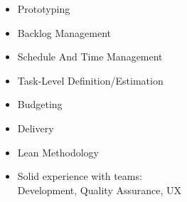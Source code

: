 
  \begin{itemize}
    \setlength\itemsep{-0.3em}
    \item Prototyping
    \item Backlog Management 
    \item Schedule And Time Management
    \item Task-Level Definition/Estimation
    \item Budgeting
    \item Delivery
    \item Lean Methodology
    \item Solid experience with teams: \\ 
    Development,
    Quality Assurance,
    UX 
    \wt{
    }
    \en{
    } 
    \projectm{
    }
  \end{itemize}

  
